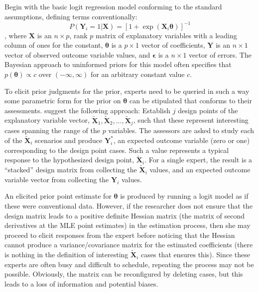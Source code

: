 \documentclass[11pt]{article}
\begin{document}
Begin with the basic logit regression model conforming to the standard assumptions, defining terms conventionally: 
\begin{equation}
  P(\mathbf{Y}_i=1|\mathbf{X})=[1+\exp(\mathbf{X}_i\boldsymbol{\theta})]^{-1}
\end{equation}
, where $\mathbf{X}$ is an $n \times p$, rank $p$ matrix of explanatory variables with a leading column of 
 ones for the constant, $\boldsymbol{\theta}$  is a $p \times 1$ vector of coefficients,
  $\mathbf{Y}$ is an $n \times 1$ vector of observed outcome 
variable values, and $\boldsymbol{\epsilon}$ is a $n \times 1$ vector of errors. The Bayesian approach to 
uninformed priors for this model often specifies that $p(\boldsymbol{\theta}) \propto c$ over 
$(-\infty,\infty)$ for an arbitrary constant value $c$. 

To elicit prior judgments for the prior, experts need to be queried in such a way 
some parametric form for the prior on $\boldsymbol{\theta}$ can be stipulated that conforms to their 
assessments. \citet{KadDicWin80} suggest the following approach: Establish $j$ design 
points of the explanatory variable vector, $\tilde{\mathbf{X}}_1,\tilde{\mathbf{X}}_2,\ldots,\tilde{\mathbf{X}}_j$,
such that these represent interesting cases spanning the range of the $p$ variables.
The assessors are asked to study each of the $\tilde{\mathbf{X}}_i$ scenarios and produce $\mathbf{Y}^*_i$, 
an expected outcome variable (zero or one) corresponding to the design point cases. Such a 
value represents a typical response to the hypothesized design point, $\tilde{\mathbf{X}}_i$. For a 
single expert, the result is a ``stacked'' design matrix from collecting the $\tilde{\mathbf{X}}_i$ 
values, and an expected outcome variable vector from collecting the $\mathbf{Y}_i$ values. 

An elicited prior point estimate for $\boldsymbol{\boldsymbol{\theta}}$ is produced by running a logit model
as if these were conventional data. However, if the researcher does not 
ensure that the design matrix leads to a positive definite Hessian matrix (the matrix of second
derivatives at the MLE point estimates) in the estimation process, then she may proceed to elicit responses 
from the expert before noticing that the Hessian cannot produce a variance/covariance matrix for 
the estimated coefficients (there is nothing in the definition of 
interesting $\tilde{\mathbf{X}}_i$ cases that ensures this). Since these experts are often busy and difficult to schedule, 
repeating the process may not be possible. Obviously, the matrix can be reconfigured by 
deleting cases, but this leads to a loss of information and potential biases. 
\end{document}
